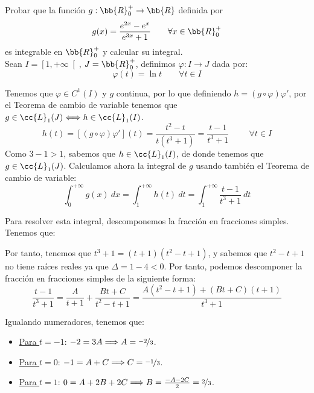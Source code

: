 \begin{ejercicio} Probar que la función $g:\bb{R}_0^+\to \bb{R}$ definida por
    \begin{equation*}
        g(x) = \frac{e^{2x}-e^x}{e^{3x}+1}
        \qquad \forall x\in \bb{R}_0^+
    \end{equation*}
    es integrable en $\bb{R}_0^+$ y calcular su integral.\\

    Sean $I=\left[1,+\infty\right[$, $J=\bb{R}^+_0$, definimos $\varphi:I\longrightarrow J$ dada por:
    \begin{equation*}
        \varphi(t) = \ln t \qquad \forall t\in I
    \end{equation*}
    
    Tenemos que $\varphi \in C^1(I)$ y $g$ continua, por lo que definiendo $h=(g\circ \varphi)\varphi'$, por el Teorema de cambio de variable tenemos que $g\in \cc{L}_1(J)\Longleftrightarrow h\in \cc{L}_1(I)$.
    \begin{equation*}
        h(t) = [(g\circ \varphi)\varphi'](t) = \dfrac{t^2-t}{t(t^3+1)} = \dfrac{t-1}{t^3 + 1} \hspace{1cm} \forall t\in I
    \end{equation*}
    Como $3-1>1$, sabemos que $h\in \cc{L}_1(I)$, de donde tenemos que $g\in \cc{L}_1(J)$. Calculamos ahora la integral de $g$ usando también el Teorema de cambio de variable:
    \begin{equation*}
        \int_0^{+\infty} g(x)~dx = \int_1^{+\infty} h(t)~dt = \int_1^{+\infty} \dfrac{t-1}{t^3+1}~dt
    \end{equation*}

    Para resolver esta integral, descomponemos la fracción en fracciones simples. Tenemos que:
    \begin{figure}[H]
        \centering
    \end{figure}

    Por tanto, tenemos que $t^3+1 = (t+1)(t^2-t+1)$, y sabemos que $t^2-t+1$ no tiene raíces reales ya que $\Delta = 1-4<0$.
    Por tanto, podemos descomponer la fracción en fracciones simples de la siguiente forma:
    \begin{equation*}
        \dfrac{t-1}{t^3+1} = \dfrac{A}{t+1} + \dfrac{Bt+C}{t^2-t+1} = \dfrac{A(t^2-t+1) + (Bt+C)(t+1)}{t^3+1}
    \end{equation*}

    Igualando numeradores, tenemos que:
    \begin{itemize}
        \item \ul{Para $t=-1$}: $-2 = 3A \Longrightarrow A=\nicefrac{-2}{3}$.
        \item \ul{Para $t=0$}: $-1 = A + C \Longrightarrow C=\nicefrac{-1}{3}$.
        \item \ul{Para $t=1$}: $0 = A + 2B + 2C \Longrightarrow B=\frac{-A-2C}{2}=\nicefrac{2}{3}$.
    \end{itemize}


\end{ejercicio}
